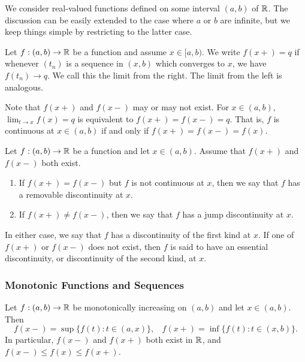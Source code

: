 \documentclass[12pt]{article} %
\begin{document}
We consider real-valued functions defined on some interval $(a, b)$ of $\mathbb{R}$. The discussion can be easily extended to the case where $a$ or $b$ are infinite, but we keep things simple by restricting to the latter case.

\begin{definition}
    Let $f : (a, b) \to \mathbb{R}$ be a function and assume $x \in [a, b)$. We write $f(x+) = q$ if whenever $(t_n)$ is a sequence in $(x, b)$ which converges to $x$, we have $f(t_n) \to q$. We call this the limit from the right. The limit from the left is analogous.
\end{definition}

\begin{remark}
    Note that $f(x+)$ and $f(x-)$ may or may not exist. For $x \in (a, b)$, $\lim_{t \to x} f(x) = q$ is equivalent to $f(x+) = f(x-) = q$. That is, $f$ is continuous at $x \in (a,b)$ if and only if ${f(x+) = f(x-) = f(x)}$.
\end{remark}

\begin{definition}
    Let $f : (a, b) \to \mathbb{R}$ be a function and let $x \in (a,b)$. Assume that $f(x+)$ and $f(x-)$ both exist. \begin{enumerate}
        \item If $f(x+) = f(x-)$ but $f$ is not continuous at $x$, then we say that $f$ has a removable discontinuity at $x$.
        \item If $f(x+) \neq f(x-)$, then we say that $f$ has a jump discontinuity at $x$. 
    \end{enumerate} In either case, we say that $f$ has a discontinuity of the first kind at $x$. If one of $f(x+)$ or $f(x-)$ does not exist, then $f$ is said to have an essential discontinuity, or discontinuity of the second kind, at $x$.
\end{definition}

\subsubsection{Monotonic Functions and Sequences}

\begin{theorem}
    Let $f : (a, b) \to \mathbb{R}$ be monotonically increasing on $(a, b)$ and let $x \in (a, b)$. Then \[f(x-) = \sup\{f(t) : t \in (a, x)\}, \ \ \ \ f(x+) = \inf\{f(t) : t \in (x, b)\}.\] In particular, $f(x-)$ and $f(x+)$ both exist in $\mathbb{R}$, and $f(x-) \leq f(x) \leq f(x+)$.
\end{theorem}
\end{document}
